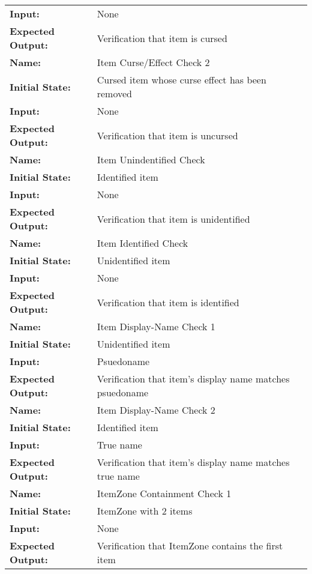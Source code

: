 \documentclass[12pt, titlepage]{article}
\begin{document}
\begin{center}
\begin{longtable}{ l | p{10cm} }
				\textbf{Input:} & None\\
				\textbf{Expected Output:} & Verification that item is cursed\\[1em]
				\hline
				\rule{0pt}{2em}\textbf{Name:} & Item Curse/Effect Check 2\\
				\textbf{Initial State:} & Cursed item whose curse effect has been removed\\
				\textbf{Input:} & None\\
				\textbf{Expected Output:} & Verification that item is uncursed\\[1em]
				\hline
				\rule{0pt}{2em}\textbf{Name:} & Item Unindentified Check\\
				\textbf{Initial State:} & Identified item\\
				\textbf{Input:} & None\\
				\textbf{Expected Output:} & Verification that item is unidentified\\[1em]
				\hline
				\rule{0pt}{2em}\textbf{Name:} & Item Identified Check\\
				\textbf{Initial State:} & Unidentified item\\
				\textbf{Input:} & None\\
				\textbf{Expected Output:} & Verification that item is identified\\[1em]
				\hline
				\rule{0pt}{2em}\textbf{Name:} & Item Display-Name Check 1\\
				\textbf{Initial State:} & Unidentified item\\
				\textbf{Input:} & Psuedoname\\
				\textbf{Expected Output:} & Verification that item's display name matches psuedoname\\[1em]
				\hline
				\rule{0pt}{2em}\textbf{Name:} & Item Display-Name Check 2\\
				\textbf{Initial State:} & Identified item\\
				\textbf{Input:} & True name\\
				\textbf{Expected Output:} & Verification that item's display name matches true name\\[1em]
				\hline
				\rule{0pt}{2em}\textbf{Name:} & ItemZone Containment Check 1\\
				\textbf{Initial State:} & ItemZone with 2 items\\
				\textbf{Input:} & None\\
				\textbf{Expected Output:} & Verification that ItemZone contains the first item\\[1em]

\end{longtable}
\end{center}
\end{document}
